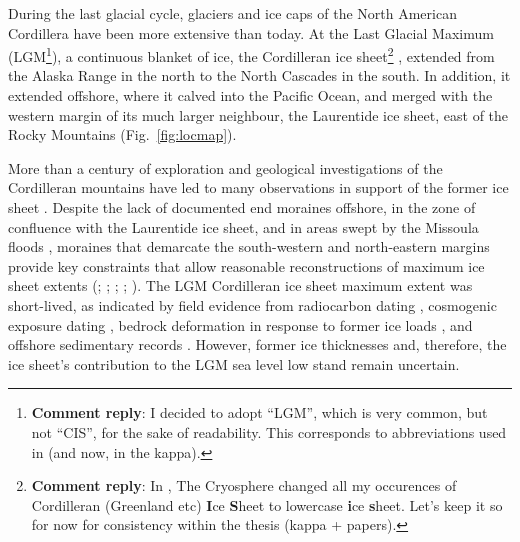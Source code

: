 \documentclass[tc, manuscript]{copernicus}
\newcommand{\renote}[1]{\footnote{\textbf{Comment reply}: #1}}
\begin{document}
\introduction
\label{sec:intro}

During the last glacial cycle, glaciers and ice caps of the North American
Cordillera have been more extensive than today. At the Last Glacial
Maximum (LGM\renote{
    I decided to adopt ``LGM'', which is very common, but not ``CIS'', for the
    sake of readability. This corresponds to abbreviations used in
    \citet{Seguinot.etal.2014} (and now, in the kappa).}),
a continuous blanket of ice, the Cordilleran ice sheet\renote{
    In \citet{Seguinot.etal.2014}, The Cryosphere changed all my occurences of
    Cordilleran (Greenland etc) \textbf{I}ce \textbf{S}heet to lowercase
    \textbf{i}ce \textbf{s}heet. Let's keep it so for now for consistency
    within the thesis (kappa + papers).}
\citep{Dawson.1888}, extended from the Alaska Range in the north to the
North Cascades in the south. In addition, it extended offshore, where it calved
into the Pacific Ocean, and merged with the western margin of its much larger
neighbour, the Laurentide ice sheet, east of the Rocky Mountains
(Fig.~\ref{fig:locmap}).

More than a century of exploration and geological investigations of the
Cordilleran mountains have led to many observations in support of the former
ice sheet
    \citep{Jackson.Clague.1991}.
Despite the lack of documented end moraines offshore, in the zone of confluence
with the Laurentide ice sheet, and in areas swept by the Missoula floods
    \citep{Carrara.etal.1996},
moraines that demarcate the south-western and north-eastern margins provide key
constraints that allow reasonable reconstructions of maximum ice sheet extents
    (\citealp{Prest.etal.1968}; \citealp[Fig. 1.12]{Clague.1989};
     \citealp{Duk-Rodkin.1999};
     \citealp{Booth.etal.2003}; \citealp{Dyke.2004}).
The LGM Cordilleran ice sheet maximum extent was short-lived, as indicated by
field evidence from radiocarbon dating
    \citep{Clague.etal.1980, Clague.1985, Clague.1986, Porter.Swanson.1998,
           Menounos.etal.2008},
cosmogenic exposure dating
    \citep{Stroeven.etal.2010, Stroeven.etal.2014, Margold.etal.2014},
bedrock deformation in response to former ice loads
    \citep{Clague.James.2002, Clague.etal.2005},
and offshore sedimentary records
    \citep{Cosma.etal.2008, Davies.etal.2011}.
However, former ice thicknesses and, therefore, the ice sheet's contribution to
the LGM sea level low stand
    \citep{Carlson.Clark.2012, Clark.Mix.2002}
remain uncertain.
\end{document}
